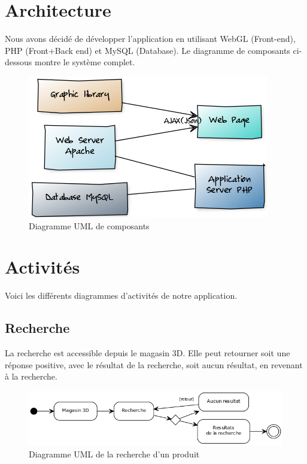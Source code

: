 \documentclass[12pt]{article}
\begin{document}
\newpage
\section{Architecture}
Nous avons décidé de développer l'application en utilisant WebGL (Front-end), PHP (Front+Back end) et MySQL (Database).
Le diagramme de composants ci-dessous montre le système complet.
\begin{figure}[ht]
    \center
    \includegraphics[scale=0.6]{../Diagrams/ComposantDiagrams/composants.png}
    \caption*{Diagramme UML de composants}
\end{figure}

\newpage
\section{Activités}

Voici les différents diagrammes d'activités de notre application.

\subsection{Recherche}

La recherche est accessible depuis le magasin 3D. Elle peut retourner soit une réponse positive,
avec le résultat de la recherche, soit aucun résultat, en revenant à la recherche.

\begin{figure}[ht]
    \center
    \includegraphics[scale=0.6]{../Diagrams/ActivityDiagrams/recherche.png}
    \caption*{Diagramme UML de la recherche d'un produit}
\end{figure}
\end{document}
